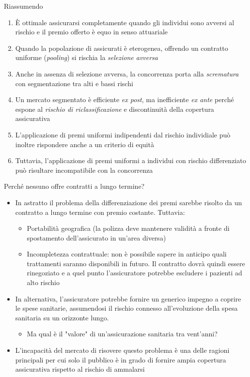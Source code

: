 \documentclass[aspectratio=64,11pt]{beamer}
\begin{document}
\begin{frame}{Riassumendo}
\begin{enumerate}
\item È ottimale assicurarsi completamente quando gli individui sono avversi al
rischio e il premio offerto è equo in senso attuariale
\item Quando la popolazione di assicurati è eterogenea, offrendo un contratto
uniforme (\emph{pooling}) si rischia la \emph{selezione avversa}
\item Anche in assenza di selezione avversa, la concorrenza porta alla
\emph{scrematura} con segmentazione tra alti e bassi rischi
\item Un mercato segmentato è efficiente \emph{ex post}, ma inefficiente \emph{ex ante}
perché espone al \emph{rischio di riclassificazione} e discontinuità della
copertura assicurativa
\item L'applicazione di premi uniformi indipendenti dal rischio individiale può
inoltre rispondere anche a un criterio di equità
\item Tuttavia, l'applicazione di premi uniformi a individui con rischio
differenziato può risultare incompatibile con la concorrenza
\end{enumerate}
\end{frame}

\begin{frame}{Perché nessuno offre contratti a lungo termine?}
\begin{itemize}
\item In astratto il problema della differenziazione dei premi sarebbe risolto da
un contratto a lungo termine con premio costante. Tuttavia:
\begin{itemize}
\item Portabilità geografica (la polizza deve mantenere validità a fronte di
spostamento dell'assicurato in un'area diversa)
\item Incompletezza contrattuale: non è possibile sapere in anticipo quali
trattamenti saranno disponibili in futuro. Il contratto dovrà quindi
essere rinegoziato e a quel punto l'assicuratore potrebbe escludere i
pazienti ad alto rischio
\end{itemize}
\item In alternativa, l'assicuratore potrebbe fornire un generico impegno a
coprire le spese sanitarie, assumendosi il rischio connesso all'evoluzione
della spesa sanitaria su un orizzonte lungo.
\begin{itemize}
\item Ma qual è il "valore" di un'assicurazione sanitaria tra vent'anni?
\end{itemize}
\item L'incapacità del mercato di risovere questo problema è una delle ragioni
principali per cui solo il pubblico è in grado di fornire ampia copertura
assicurativa rispetto al rischio di ammalarsi
\end{itemize}
\end{frame}
\end{document}
